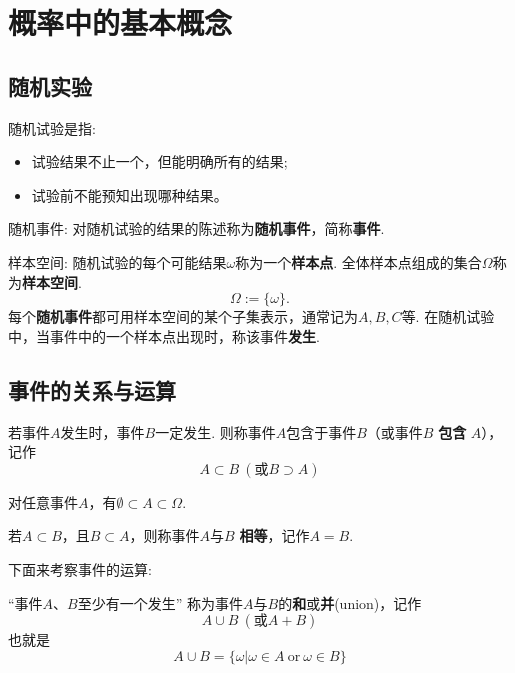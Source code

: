 \section{概率中的基本概念}
\subsection{随机实验}

\begin{definition}
    随机试验是指: 
    \begin{itemize}
        \item 试验结果不止一个，但能明确所有的结果; 
        \item 试验前不能预知出现哪种结果。
    \end{itemize}
\end{definition}

\begin{definition}
    随机事件: 对随机试验的结果的陈述称为\textbf{随机事件}，简称\textbf{事件}. 
\end{definition}

\begin{definition}
    样本空间: 随机试验的每个可能结果$\omega$称为一个\textbf{样本点}. 全体样本点组成的集合$\Omega$称为\textbf{样本空间}. 
    $$
        \Omega:=\{\omega\}.
    $$
    每个\textbf{随机事件}都可用样本空间的某个子集表示，通常记为$A, B, C$等. 
    在随机试验中，当事件中的一个样本点出现时，称该事件\textbf{发生}. 
\end{definition}

\subsection{事件的关系与运算}

\begin{definition}[事件的关系] 
    若事件$A$发生时，事件$B$一定发生. 则称事件$A$包含于事件$B$（或事件$B$ \textbf{包含} $A$），记作
    $$A\subset B \ (\text{或}B\supset A)$$

    对任意事件$A$，有$\emptyset \subset A\subset \Omega$. 

    若$A\subset B$，且$B\subset A$，则称事件$A$与$B$ \textbf{相等}，记作$A=B$. 
    
\end{definition}

下面来考察事件的运算: 

\begin{definition}[事件的并]
    
        “事件$A$、$B$至少有一个发生”
    称为事件$A$与$B$的\textbf{和}或\textbf{并}(union)，记作
    $$A\cup B \ (\text{或}A+B)$$
    也就是
    $$A\cup B=\{\omega | \omega\in A \ \text{or}\ \omega\in B\}$$
\end{definition}

